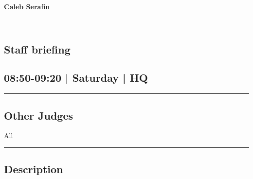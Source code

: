 \documentclass[10pt, A5]{article}
\newcommand{\newtitle}[1]{\begin{center}{\Huge\bfseries #1 }\\ \vspace{5mm}\end{center}}
\newcommand{\newsubtitle}[1]{\begin{center}{\color{grey}\Large\bfseries #1 }\\ \vspace{5mm}\end{center}}
\begin{document}
		\newtitle{Caleb Serafin}
	\newsubtitle{}



    
	
	

		\begin{framed}
			\begin{minipage}{\textwidth}

			\setcounter{section}{13}
							\section{Staff briefing}
						
			\subsection*{08:50-09:20 | Saturday | HQ}

			\vspace{0.25cm}
			\hrule
			\vspace{0.25cm}


			\subsection*{Other Judges}
							All

					\vspace{0.25cm}
			\hrule
			\vspace{0.25cm}

			\begin{minipage}{\textwidth}
			\subsection*{\faListAlt \: Description}
			
			\end{minipage}


	\end{minipage}
	\end{framed}

	
\end{document}
